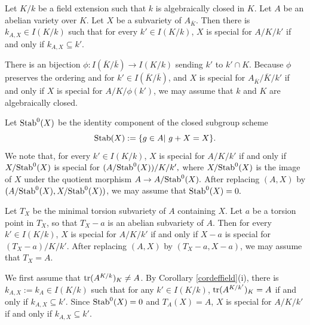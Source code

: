 \documentclass[12pt]{amsart}
\begin{document}




\begin{pro}\label{lemnonspecial}
Let $K/k$ be a field extension such that $k$ is algebraically closed in $K$. 
Let $A$ be an abelian variety over $K$.  Let $X$ be a subvariety of $A_{\overline{K}}.$
Then there is $k_{A,X}\in I(K/k)$ such that for every $k'\in I(K/k)$, $X$ is special  for $A/K/k'$  if and only if $k_{A,X}\subseteq k'$.
\end{pro}

\proof 
There is an bijection $\phi: I(\overline{K}/\overline{k})\to I(K/k)$ sending $k'$ to $k'\cap K.$ Because $\phi$ preserves the ordering and for $k'\in I(\overline{K}/\overline{k})$, and 
$X$ is special  for $A_{\overline{K}}/\overline{K}/k'$ if and only if $X$ is special  for $A/K/\phi(k')$, we may assume that $k$ and $K$ are algebraically closed.



\medskip


Let ${\mathrm{Stab}}^0(X)$ be the identity component of the closed subgroup scheme
$${\mathrm{Stab}}(X):=\{g\in A|\,\, g+X=X\}.$$ 
We note that, for every $k'\in I(K/k)$,  $X$ is special  for $A/K/k'$ if and only if $X/{\mathrm{Stab}}^0(X)$ is special  for $(A/{\mathrm{Stab}}^0(X))/K/k',$
where  $X/{\mathrm{Stab}}^0(X)$ is the image of $X$ under the quotient morphism $A\to A/{\mathrm{Stab}}^0(X).$
After replacing $(A, X)$ by $(A/{\mathrm{Stab}}^0(X), X/{\mathrm{Stab}}^0(X))$, we may assume that ${\mathrm{Stab}}^0(X)=0.$


Let $T_X$ be the minimal torsion subvariety of $A$ containing $X.$ Let $a$ be a torsion point in $T_X$, so that $T_X-a$ is an abelian subvariety of $A$. 
Then for every $k'\in I(K/k)$,  $X$ is special  for $A/K/k'$ if and only if $X-a$ is special  for $(T_X-a)/K/k'.$ After replacing $(A,X)$ by $(T_X-a, X-a)$, we may assume that $T_X=A.$



We first assume that ${\rm tr}(A^{K/k})_K\neq A$. 
By Corollary \ref{cordeffield}(i), there is $k_{A,X}:=k_A\in I(K/k)$ such that for any $k'\in I(K/k)$,
${\rm tr}(A^{K/k'})_K= A$ if and only if $k_{A,X}\subseteq k'.$ 
Since ${\mathrm{Stab}}^0(X)=0$ and $T_A(X)=A$, $X$ is special for $A/K/k'$ if and only if $k_{A,X}\subseteq k'.$
\end{document}
